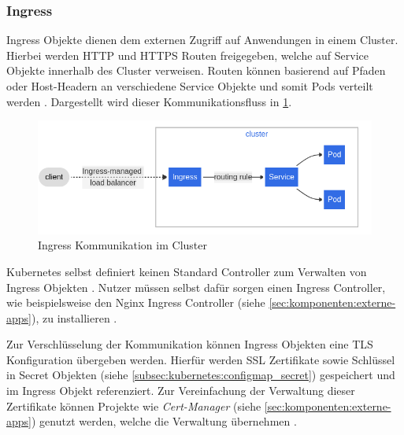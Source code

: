 \subsubsection{Ingress}
\label{subsec:kubernetes:ingress}
Ingress Objekte dienen dem externen Zugriff auf Anwendungen in einem Cluster.
Hierbei werden HTTP und HTTPS Routen freigegeben, 
welche auf Service Objekte innerhalb des Cluster verweisen.
Routen können basierend auf Pfaden oder Host-Headern an verschiedene Service Objekte und somit Pods verteilt werden \cite{kubernetesIngress}.
Dargestellt wird dieser Kommunikationsfluss in \ref{fig:ingress_communication}.

\begin{figure}[h]
  \centering
  \includegraphics[width=\textwidth]{gfx/chapters/2_grundlagen/ingress.png}
  \caption{Ingress Kommunikation im Cluster}
  \label{fig:ingress_communication}
\end{figure}

Kubernetes selbst definiert keinen Standard Controller zum Verwalten von Ingress Objekten \cite{Burns2019}.
Nutzer müssen selbst dafür sorgen einen Ingress Controller, 
wie beispielsweise den Nginx Ingress Controller (siehe \ref{sec:komponenten:externe-apps}), zu installieren \cite{Burns2019}.

Zur Verschlüsselung der Kommunikation können Ingress Objekten eine TLS Konfiguration übergeben werden.
Hierfür werden SSL Zertifikate sowie Schlüssel in Secret Objekten (siehe \ref{subsec:kubernetes:configmap_secret}) gespeichert und im
Ingress Objekt referenziert. 
Zur Vereinfachung der Verwaltung dieser Zertifikate können Projekte wie \emph{Cert-Manager} (siehe \ref{sec:komponenten:externe-apps})
genutzt werden, welche die Verwaltung übernehmen \cite{Burns2019}.